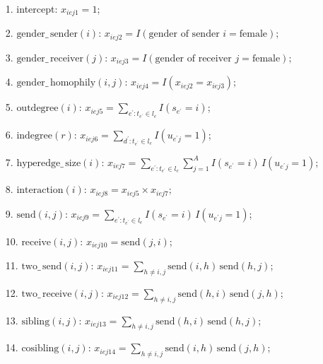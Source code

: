 \documentclass[ba]{imsart}
\numberwithin{equation}{section}
\theoremstyle{plain}
\begin{document}
	\begin{itemize}
		\item[1.] intercept: ${x}_{iej1} =1$;
		\item[2.] $\mbox{gender}\_\,\mbox{sender}(i)$: ${x}_{iej2} = I(\mbox{gender of sender } i= \mbox{female});$
		\item[3.] $\mbox{gender}\_\,\mbox{receiver}(j)$: ${x}_{iej3} = I(\mbox{gender of receiver } j= \mbox{female});$
		\item[4.] $\mbox{gender}\_\,\mbox{homophily}(i, j)$: ${x}_{iej4} = I({x}_{iej2}={x}_{iej3});$ 	   		
		\item[5.] $\mbox{outdegree}(i)$: ${x}_{iej5} =\sum_{e^\prime: t_{e^\prime} \in l_e} I(s_{e^\prime} = i)$;
		\item[6.] $\mbox{indegree}(r)$: ${x}_{iej6}=\sum_{d^\prime: t_{e^\prime} \in l_e} I(u_{e^\prime j} = 1)$;
		\item[7.] $\mbox{hyperedge}\_\,\mbox{size}(i)$: ${x}_{iej7}=\sum_{e^\prime: t_{e^\prime} \in l_e} \sum_{j=1}^A I(s_{e^\prime} = i)\,I(u_{e^\prime j} = 1)$;
		\item[8.] $\mbox{interaction}(i)$: ${x}_{iej8} = {x}_{iej5}\times{x}_{iej7};$
		\item[9.] $\mbox{send}(i, j)$: ${x}_{iej9}=\sum_{e^\prime: t_{e^\prime} \in l_e} I(s_{e^\prime} = i)\,I(u_{e^\prime j} = 1)$;
		\item[10.] $\mbox{receive}(i,j)$: ${x}_{iej10}=\mbox{send}(j,i)$;
		\item[11.] $\mbox{two}\_\,\mbox{send}(i,j)$: ${x}_{iej11} = \sum_{h \neq i,j} \mbox{send}(i,h)\,\mbox{send}(h,j)$;
		\item[12.] $\mbox{two}\_\,\mbox{receive}(i,j)$: ${x}_{iej12}= \sum_{h \neq i, j} \mbox{send}(h,i)\,\mbox{send}(j,h)$;
		\item[13.] $\mbox{sibling}(i, j)$: ${x}_{iej13}=\sum_{h \neq i, j} \mbox{send}(h,i)\,\mbox{send}(h,j)$;
		\item[14.] $\mbox{cosibling}(i, j)$: ${x}_{iej14}=\sum_{h \neq i,j} \mbox{send}(i,h)\,\mbox{send}(j,h)$;
	\end{itemize}
\end{document}
